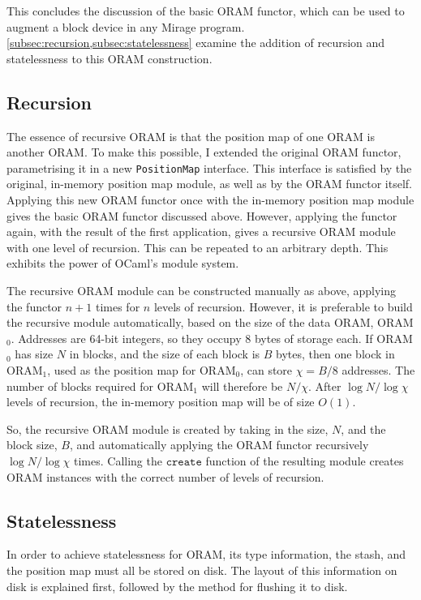 \documentclass[12pt,a4paper,twoside,openright]{report}
\begin{document}
This concludes the discussion of the basic ORAM functor, which can be used to augment a block device in any Mirage program. \cref{subsec:recursion,subsec:statelessness} examine the addition of recursion and statelessness to this ORAM construction.

\subsection{Recursion}
\label{subsec:recursion}

The essence of recursive ORAM is that the position map of one ORAM is another ORAM. To make this possible, I extended the original ORAM functor, parametrising it in a new \texttt{PositionMap} interface. This interface is satisfied by the original, in-memory position map module, as well as by the ORAM functor itself. Applying this new ORAM functor once with the in-memory position map module gives the basic ORAM functor discussed above. However, applying the functor again, with the result of the first application, gives a recursive ORAM module with one level of recursion. This can be repeated to an arbitrary depth. This exhibits the power of OCaml's module system.

The recursive ORAM module can be constructed manually as above, applying the functor $n + 1$ times for $n$ levels of recursion. However, it is preferable to build the recursive module automatically, based on the size of the data ORAM, ORAM$_0$. Addresses are 64-bit integers, so they occupy 8 bytes of storage each. If ORAM$_0$ has size $N$ in blocks, and the size of each block is $B$ bytes, then one block in ORAM$_1$, used as the position map for ORAM$_0$, can store $\chi = B / 8$ addresses. The number of blocks required for ORAM$_1$ will therefore be $N / \chi$. After $\log N / \log \chi$ levels of recursion, the in-memory position map will be of size $O(1)$.

So, the recursive ORAM module is created by taking in the size, $N$, and the block size, $B$, and automatically applying the ORAM functor recursively $\log N / \log \chi$ times. Calling the $\mathtt{create}$ function of the resulting module creates ORAM instances with the correct number of levels of recursion.

\subsection{Statelessness}
\label{subsec:statelessness}

In order to achieve statelessness for ORAM, its type information, the stash, and the position map must all be stored on disk. The layout of this information on disk is explained first, followed by the method for flushing it to disk.
\end{document}

